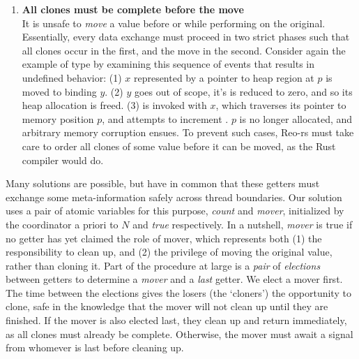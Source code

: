 \begin{enumerate}
	\item \textbf{All clones must be complete before the move}\\
	 It is unsafe to \textit{move} a value before or while performing  on the original. Essentially, every data exchange must proceed in two strict phases such that all clones occur in the first, and the move in the second.
	 Consider again the example of type  by examining this sequence of events that results in undefined behavior: (1)  $x$ represented by a pointer to heap region at $p$ is moved to binding $y$. (2) $y$ goes out of scope, it's  is reduced to zero, and so its heap allocation is freed. (3)  is invoked with $x$, which traverses its pointer to memory position $p$, and attempts to increment . $p$ is no longer allocated, and arbitrary memory corruption ensues. To prevent such cases, Reo-rs must take care to order all clones of some value before it can be moved, as the Rust compiler would do.
\end{enumerate}

Many solutions are possible, but have in common that these getters must exchange some meta-information safely across thread boundaries. Our solution uses a pair of atomic variables for this purpose, \textit{count} and \textit{mover}, initialized by the coordinator a priori to $N$ and \textit{true} respectively. In a nutshell, \textit{mover} is true if no getter has yet claimed the role of mover, which represents both (1) the responsibility to clean up, and (2) the privilege of moving the original value, rather than cloning it. Part of the procedure at large is a \textit{pair} of \textit{elections} between getters to determine a \textit{mover} and a \textit{last} getter. We elect a mover first. The time between the elections gives the losers (the `cloners') the opportunity to clone, safe in the knowledge that the mover will not clean up until they are finished. If the mover is also elected last, they clean up and return immediately, as all clones must already be complete. Otherwise, the mover must await a signal from whomever is last before cleaning up.

